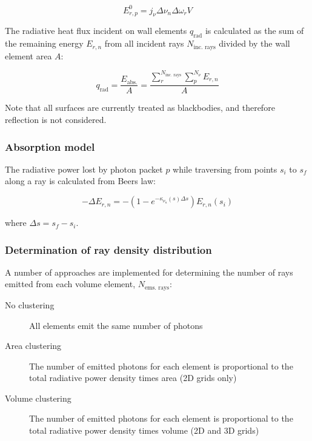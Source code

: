 \begin{equation}
 E_{r,p}^0 = j_{\nu} \Delta \nu_{n} \Delta \omega_{r} V
\end{equation}

The radiative heat flux incident on wall elements $q_\text{rad}$ is calculated as the sum of the remaining energy $E_{r,n}$ from all incident rays $N_\text{inc. rays}$ divided by the wall element area $A$:

\begin{equation}
 q_\text{rad} = \frac{ E_\text{abs.} }{A} =  \frac{ \displaystyle \sum_{r}^{N_{\text{inc. rays}}} \displaystyle \sum_{p}^{N_{\nu}} E_{r,n} }{ A }
 \label{eq:my_divq}
\end{equation}

\noindent Note that all surfaces are currently treated as blackbodies, and therefore reflection is not considered.

\subsubsection{Absorption model}

The radiative power lost by photon packet $p$ while traversing from points $s_{i}$ to $s_{f}$ along a ray is calculated from Beers law:

\begin{equation}
 - \Delta E_{r,n} = - ( 1 - e^{-\kappa_{\nu_{n}}(s) \Delta s } ) E_{r,n}(s_{i})
 \label{eq:E_rn}
\end{equation}

\noindent where $\Delta s = s_{f} - s_{i}$.

\subsubsection{Determination of ray density distribution}
\label{sec:ray_density_distribution}

A number of approaches are implemented for determining the number of rays emitted from each volume element, $N_{\text{ems. rays}}$:

\begin{description}
 \item[No clustering] All elements emit the same number of photons
 \item[Area clustering] The number of emitted photons for each element is proportional to the total radiative power density times area (2D grids only)
 \item[Volume clustering] The number of emitted photons for each element is proportional to the total radiative power density times volume (2D and 3D grids)
\end{description}

